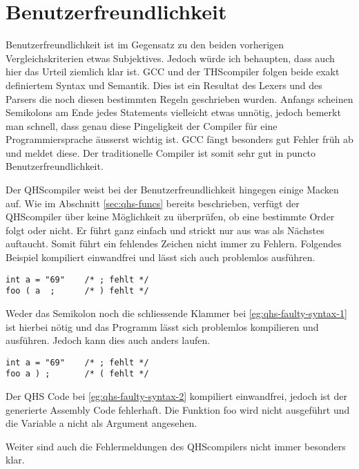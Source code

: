 \section{Benutzerfreundlichkeit}
Benutzerfreundlichkeit ist im Gegensatz zu den beiden vorherigen Vergleichskriterien etwas Subjektives. Jedoch würde ich behaupten, dass auch hier das Urteil ziemlich klar ist.
GCC und der THScompiler folgen beide exakt definiertem Syntax und Semantik. Dies ist ein Resultat des Lexers und des Parsers die noch diesen bestimmten Regeln geschrieben wurden.
Anfangs scheinen Semikolons am Ende jedes Statements vielleicht etwas unnötig, jedoch bemerkt man schnell, dass genau diese Pingeligkeit der Compiler für eine Programmiersprache äusserst wichtig ist.
GCC fängt besonders gut Fehler früh ab und meldet diese. Der traditionelle Compiler ist somit sehr gut in puncto Benutzerfreundlichkeit.

Der QHScompiler weist bei der Benutzerfreundlichkeit hingegen einige Macken auf.
Wie im Abschnitt \ref{sec:qhs-funcs} bereits beschrieben, verfügt der QHScompiler über keine Möglichkeit zu überprüfen, ob eine bestimmte Order folgt oder nicht.
Er führt ganz einfach und strickt nur aus was als Nächstes auftaucht. Somit führt ein fehlendes Zeichen nicht immer zu Fehlern. Folgendes Beispiel kompiliert einwandfrei und lässt sich auch problemlos ausführen.

\begin{lstlisting}[language=QHS, caption=QHS mit fehlenden Tokens, label=eg:qhs-faulty-syntax-1]
int a = "69"    /* ; fehlt */
foo ( a  ;      /* ) fehlt */
\end{lstlisting}

Weder das Semikolon noch die schliessende Klammer bei \ref{eg:qhs-faulty-syntax-1} ist hierbei nötig und das Programm lässt sich problemlos kompilieren und ausführen. Jedoch kann dies auch anders laufen.

\begin{lstlisting}[language=QHS, caption=QHS mit fehlender (, label=eg:qhs-faulty-syntax-2]
int a = "69"    /* ; fehlt */
foo a ) ;       /* ( fehlt */
\end{lstlisting}

Der QHS Code bei \ref{eg:qhs-faulty-syntax-2} kompiliert einwandfrei, jedoch ist der generierte Assembly Code fehlerhaft. Die Funktion foo wird nicht ausgeführt und die Variable a nicht als Argument angesehen.

Weiter sind auch die Fehlermeldungen des QHScompilers nicht immer besonders klar.

